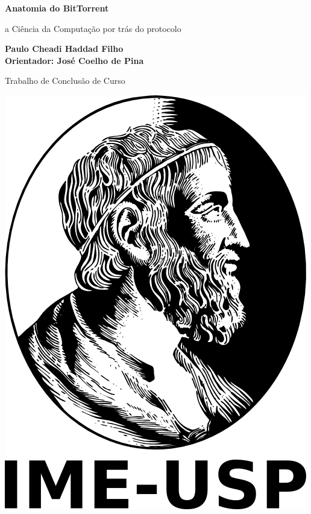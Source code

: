 \documentclass[a4paper, 11pt, oneside, brazil]{book}
\begin{document}
\thispagestyle{empty}

\frontmatter

%


\begin{titlepage}
    \begin{center}
        \vspace*{1cm}

        \Huge
        \textbf{Anatomia do BitTorrent}

        \vspace{0.5cm}
        \LARGE
        a Ciência da Computação por trás do protocolo

        \vspace{2.5cm}

        \textbf{
            Paulo Cheadi Haddad Filho \\
            Orientador: José Coelho de Pina
        }

        \vfill

        Trabalho de Conclusão de Curso

        \vspace{3.5cm}

        \includegraphics[scale=0.1]{logo-ime.png}


\end{center}
\end{titlepage}
\end{document}
